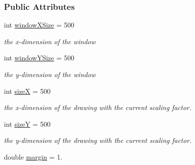 \subsubsection*{Public Attributes}
\begin{DoxyCompactItemize}
\item 
int \hyperlink{structslb_1_1core_1_1ui_1_1Graphics_a7be3cfcd2b96c069f314f77ca413a012}{window\+X\+Size} = 500\hypertarget{structslb_1_1core_1_1ui_1_1Graphics_a7be3cfcd2b96c069f314f77ca413a012}{}\label{structslb_1_1core_1_1ui_1_1Graphics_a7be3cfcd2b96c069f314f77ca413a012}

\begin{DoxyCompactList}\small\item\em the x-\/dimension of the window \end{DoxyCompactList}\item 
int \hyperlink{structslb_1_1core_1_1ui_1_1Graphics_ad361367c824b2d9cccd9d8ee76320ab6}{window\+Y\+Size} = 500\hypertarget{structslb_1_1core_1_1ui_1_1Graphics_ad361367c824b2d9cccd9d8ee76320ab6}{}\label{structslb_1_1core_1_1ui_1_1Graphics_ad361367c824b2d9cccd9d8ee76320ab6}

\begin{DoxyCompactList}\small\item\em the y-\/dimension of the window \end{DoxyCompactList}\item 
int \hyperlink{structslb_1_1core_1_1ui_1_1Graphics_ae02ff446ffd8215e15aaf79c96c99ad3}{sizeX} = 500\hypertarget{structslb_1_1core_1_1ui_1_1Graphics_ae02ff446ffd8215e15aaf79c96c99ad3}{}\label{structslb_1_1core_1_1ui_1_1Graphics_ae02ff446ffd8215e15aaf79c96c99ad3}

\begin{DoxyCompactList}\small\item\em the x-\/dimension of the drawing with the current scaling factor. \end{DoxyCompactList}\item 
int \hyperlink{structslb_1_1core_1_1ui_1_1Graphics_a5fb9d2d27de9c4f99bdd46e80b580d72}{sizeY} = 500\hypertarget{structslb_1_1core_1_1ui_1_1Graphics_a5fb9d2d27de9c4f99bdd46e80b580d72}{}\label{structslb_1_1core_1_1ui_1_1Graphics_a5fb9d2d27de9c4f99bdd46e80b580d72}

\begin{DoxyCompactList}\small\item\em the y-\/dimension of the drawing with the current scaling factor. \end{DoxyCompactList}\item 
double \hyperlink{structslb_1_1core_1_1ui_1_1Graphics_a9fd508fc1907290c21608fdcd03918b4}{margin} = 1.\hypertarget{structslb_1_1core_1_1ui_1_1Graphics_a9fd508fc1907290c21608fdcd03918b4}{}\label{structslb_1_1core_1_1ui_1_1Graphics_a9fd508fc1907290c21608fdcd03918b4}


\end{DoxyCompactItemize}
